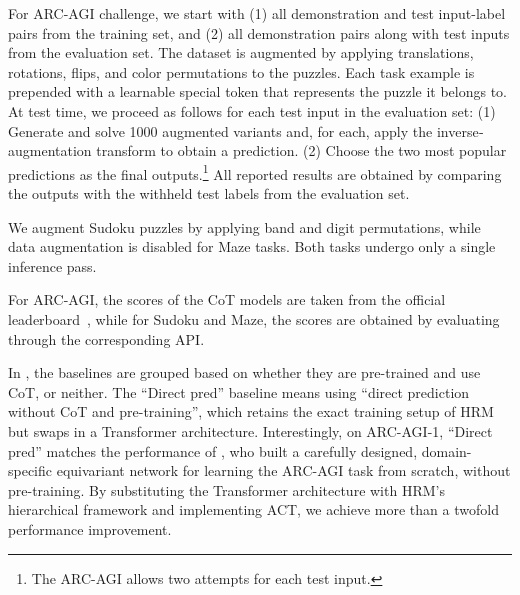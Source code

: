For ARC-AGI challenge, we start with (1) all demonstration and test input-label pairs from the training set, and (2) all demonstration pairs along with test inputs from the evaluation set. The dataset is augmented by applying translations, rotations, flips, and color permutations to the puzzles. Each task example is prepended with a learnable special token that represents the puzzle it belongs to. At test time, we proceed as follows for each test input in the evaluation set: (1) Generate and solve 1000 augmented variants and, for each, apply the inverse‐augmentation transform to obtain a prediction. (2) Choose the two most popular predictions as the final outputs.\footnote{The ARC-AGI allows two attempts for each test input.} All reported results are obtained by comparing the outputs with the withheld test labels from the evaluation set.


We augment Sudoku puzzles by applying band and digit permutations, while data augmentation is disabled for Maze tasks. Both tasks undergo only a single inference pass.

For ARC-AGI, the scores of the CoT models are taken from the official leaderboard~\citep{Chollet2025ARCAGI2AN}, while for Sudoku and Maze, the scores are obtained by evaluating through the corresponding API.


In , the baselines are grouped based on whether they are pre-trained and use CoT, or neither. The ``Direct pred'' baseline means using ``direct prediction without CoT and pre-training'', which retains the exact training setup of HRM but swaps in a Transformer architecture. Interestingly, on ARC-AGI-1, ``Direct pred'' matches the performance of \citet{liao2025arcagiwithoutpretraining}, who built a carefully designed, domain-specific equivariant network for learning the ARC-AGI task from scratch, without pre-training. By substituting the Transformer architecture with HRM's hierarchical framework and implementing ACT, we achieve more than a twofold performance improvement.

